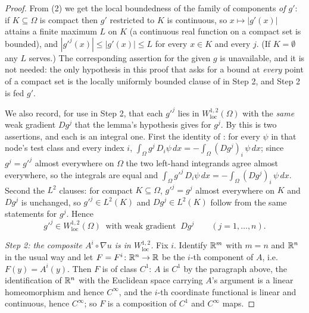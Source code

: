 \begin{proof}
From (2) we get the local boundedness of the family of components \emph{of
$g'$}: if $K\subseteq\Omega$ is compact then $g'$ restricted to $K$ is
continuous, so $x\mapsto|g'(x)|$ attains a finite maximum $L$ on $K$ (a
continuous real function on a compact set is bounded), and
$|g'^j(x)|\le|g'(x)|\le L$ for every $x\in K$ and every $j$.  (If
$K=\emptyset$ any $L$ serves.)  The corresponding assertion for the given $g$ is
unavailable, and it is not needed: the only hypothesis in this proof that asks
for a bound at \emph{every} point of a compact set is the locally uniformly
bounded clause of  in Step 2, and Step 2 is fed
$g'$.

We also record, for use in Step 2, that each $g'^j$ lies in
$W^{1,2}_{\mathrm{loc}}(\Omega)$ with the \emph{same} weak gradient $Dg^j$ that
the lemma's hypothesis gives for $g^j$.  By  this is two
assertions, and each is an integral one.  First the identity of
: for every $\psi$ in that node's test class and every
index $i$, $\int_\Omega g^j\,D_i\psi\,dx=-\int_\Omega(Dg^j)_i\,\psi\,dx$;
since $g^j=g'^j$ almost everywhere on $\Omega$ the two left-hand integrands
agree almost everywhere, so the integrals are equal and
$\int_\Omega g'^j\,D_i\psi\,dx=-\int_\Omega(Dg^j)_i\,\psi\,dx$.  Second the
$L^2$ clauses: for compact $K\subseteq\Omega$, $g'^j=g^j$ almost everywhere on
$K$ and $Dg^j$ is unchanged, so $g'^j\in L^2(K)$ and $Dg^j\in L^2(K)$ follow
from the same statements for $g^j$.  Hence
\[
g'^j\in W^{1,2}_{\mathrm{loc}}(\Omega)\ \text{ with weak gradient }\ Dg^j
\qquad(j=1,\dots,n).
\tag{0}
\]

\emph{Step 2: the composite $A^i\circ\nabla u$ is in $W^{1,2}_{\mathrm{loc}}$.}
Fix $i$.  Identify $\mathbb{R}^m$ with $m=n$ and $\mathbb{R}^n$ in the usual way and let
$F=F^i\colon\mathbb{R}^n\to\mathbb{R}$ be the $i$-th component of $A$, i.e.\
$F(y)=A^i(y)$.  Then $F$ is of class $C^1$: $A$ is $C^1$ by the paragraph
above, the identification of $\mathbb{R}^n$ with the Euclidean space carrying $A$'s
argument is a linear homeomorphism and hence $C^\infty$, and the $i$-th
coordinate functional is linear and continuous, hence $C^\infty$; so
$F$ is a composition of $C^1$ and $C^\infty$ maps.


\end{proof}
